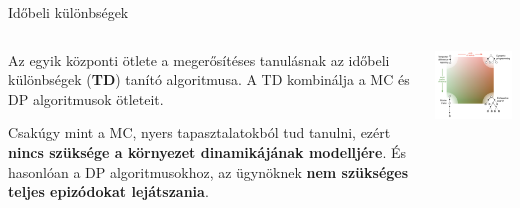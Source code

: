 \documentclass[english, aspectratio=169]{beamer}
\begin{document}
\begin{frame}{Időbeli különbségek}
\begin{columns}
\begin{column}{.5\textwidth}
Az egyik központi ötlete a megerősítéses tanulásnak az időbeli különbségek (\textbf{TD}) tanító algoritmusa. A TD kombinálja a MC és DP algoritmusok ötleteit. \par\smallskip
Csakúgy mint a MC, nyers tapasztalatokból tud tanulni, ezért \textbf{nincs szüksége a környezet dinamikájának modelljére}. És hasonlóan a DP algoritmusokhoz, az ügynöknek \textbf{nem szükséges teljes epizódokat lejátszania}.
\end{column}
\begin{column}{.5\textwidth}
\begin{center}
\includegraphics[width=7cm, keepaspectratio]{images/mc_td_7.png}
\end{center}
\end{column}
\end{columns}
\end{frame}
\end{document}
